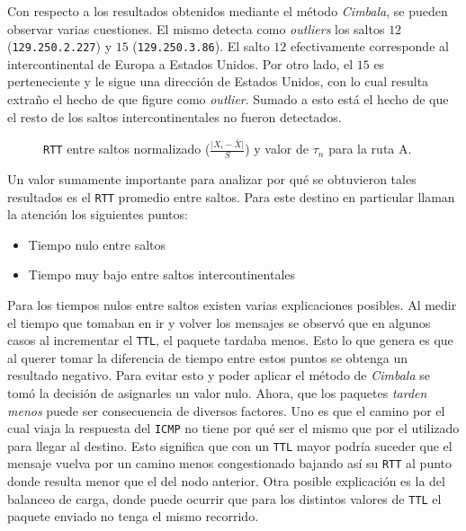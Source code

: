 Con respecto a los resultados obtenidos mediante el método \emph{Cimbala}, se
pueden observar varias cuestiones. El mismo detecta como \emph{outliers} los
saltos $12$ (\texttt{129.250.2.227}) y $15$ (\texttt{129.250.3.86}). El salto
$12$ efectivamente corresponde al intercontinental de Europa a Estados Unidos.
Por otro lado, el $15$ es perteneciente y le sigue una dirección de Estados Unidos,
con lo cual resulta extraño el hecho de que figure como \emph{outlier}. Sumado a
esto está el hecho de que el resto de los saltos intercontinentales no fueron
detectados.

\begin{figure}[H]
    \caption{\texttt{RTT} entre saltos normalizado ($\frac{\vert X_i-\bar{X}\vert}{S}$)
    y valor de $\tau_n$ para la ruta A.}
    \label{res:escA:rttnorm}
\end{figure}

Un valor sumamente importante para analizar por qué se obtuvieron tales
resultados es el \texttt{RTT} promedio entre saltos. Para este destino en
particular llaman la atención los siguientes puntos:

\begin{itemize}
    \item Tiempo nulo entre saltos
    \item Tiempo muy bajo entre saltos intercontinentales
\end{itemize}

Para los tiempos nulos entre saltos existen varias explicaciones posibles. Al
medir el tiempo que tomaban en ir y volver los mensajes se observó que en
algunos casos al incrementar el \texttt{TTL}, el paquete tardaba menos. Esto lo
que genera es que al querer tomar la diferencia de tiempo entre estos puntos se
obtenga un resultado negativo. Para evitar esto y poder aplicar el método de
\emph{Cimbala} se tomó la decisión de asignarles un valor nulo. Ahora, que los
paquetes \emph{tarden menos} puede ser consecuencia de diversos factores. Uno es
que el camino por el cual viaja la respuesta del \texttt{ICMP} no tiene por qué
ser el mismo que por el utilizado para llegar al destino.  Esto significa que con un
\texttt{TTL} mayor podría suceder que el mensaje vuelva por un camino menos
congestionado bajando así su \texttt{RTT} al punto donde resulta menor que el
del nodo anterior. Otra posible explicación es la del balanceo de carga, donde
puede ocurrir que para los distintos valores de \texttt{TTL} el paquete enviado
no tenga el mismo recorrido.

